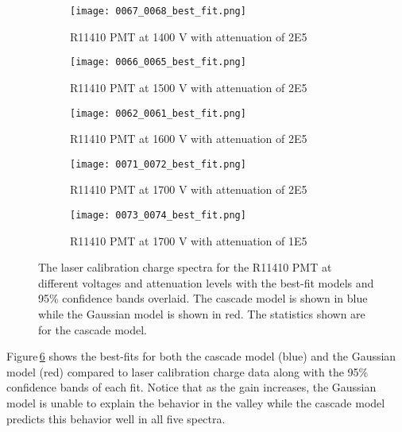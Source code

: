 \documentclass[11pt,a4paper]{article}
\newcommand\figref[1]{Figure\,\ref{#1}}
\begin{document}
\begin{figure}[t]
    \centering
    \begin{subfigure}[t]{0.49\textwidth}
        \centering
        \texttt{[image: 0067\_0068\_best\_fit.png]} 
        \caption{R11410 PMT at 1400 V with attenuation of 2E5}
        \label{fig:67_68_best}
    \end{subfigure}
    \hfill
    \begin{subfigure}[t]{0.49\textwidth}
        \centering
        \texttt{[image: 0066\_0065\_best\_fit.png]} 
        \caption{R11410 PMT at 1500 V with attenuation of 2E5}
        \label{fig:66_65_best}
    \end{subfigure}

    
    \begin{subfigure}[t]{0.49\textwidth}
        \centering
        \texttt{[image: 0062\_0061\_best\_fit.png]} 
        \caption{R11410 PMT at 1600 V with attenuation of 2E5}
        \label{fig:62_61_best}
    \end{subfigure}
    \hfill
    \begin{subfigure}[t]{0.49\textwidth}
        \centering
        \texttt{[image: 0071\_0072\_best\_fit.png]} 
        \caption{R11410 PMT at 1700 V with attenuation of 2E5}
        \label{fig:72_71_best}
    \end{subfigure}


    \begin{subfigure}[t]{0.49\textwidth}
    \centering
        \texttt{[image: 0073\_0074\_best\_fit.png]} 
        \caption{R11410 PMT at 1700 V with attenuation of 1E5}
        \label{fig:73_74_best}
    \end{subfigure}
    \caption{The laser calibration charge spectra for the R11410 PMT at different voltages and attenuation levels with the best-fit models and 95\% confidence bands overlaid.  The cascade model is shown in blue while the Gaussian model is shown in red.  The statistics shown are for the cascade model.}
    
    \label{fig:uc_best_fits}
\end{figure}


\figref{fig:uc_best_fits} shows the best-fits for both the cascade model (blue) and the Gaussian model (red) compared to laser calibration charge data along with the 95\% confidence bands of each fit.  Notice that as the gain increases, the Gaussian model is unable to explain the behavior in the valley while the cascade model predicts this behavior well in all five spectra.
\end{document}
